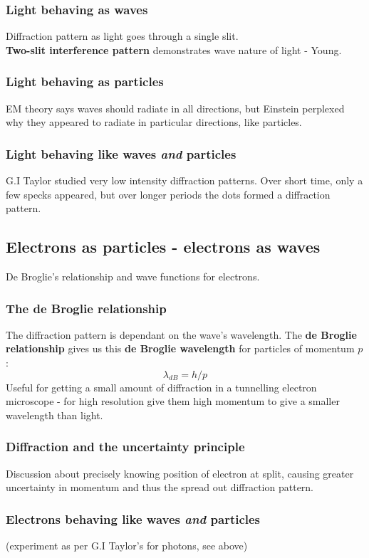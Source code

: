 \documentclass{article}
\begin{document}
\subsubsection{Light behaving as waves}
Diffraction pattern as light goes through a single slit.\\
\textbf{Two-slit interference pattern} demonstrates wave nature of light - Young.
\subsubsection{Light behaving as particles}
EM theory says waves should radiate in all directions, but Einstein perplexed why they appeared to radiate in particular directions, like particles. \\
\subsubsection{Light behaving like waves \emph{and} particles}
G.I Taylor studied very low intensity diffraction patterns. Over short time, only a few specks appeared, but over longer periods the dots formed a diffraction pattern.

\subsection{Electrons as particles - electrons as waves}
De Broglie's relationship and wave functions for electrons.\\
\subsubsection{The de Broglie relationship}
The diffraction pattern is dependant on the wave's wavelength. The \textbf{de Broglie relationship} gives us this \textbf{de Broglie wavelength} for particles of momentum $p$:\\
$$\lambda_{dB} = h / p$$
Useful for getting a small amount of diffraction in a tunnelling electron microscope - for high resolution give them high momentum to give a smaller wavelength than light.\\
\subsubsection{Diffraction and the uncertainty principle}
Discussion about precisely knowing position of electron at split, causing greater uncertainty in momentum and thus the spread out diffraction pattern.
\subsubsection{Electrons behaving like waves \emph{and} particles}
(experiment as per G.I Taylor's for photons, see above)
\end{document}
